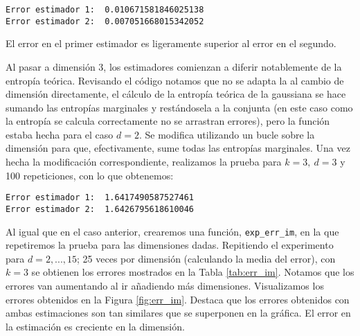 \documentclass[10pt,a4paper]{article} %
\theoremstyle{definition}
\begin{document}
\begin{lstlisting}
Error estimador 1:  0.010671581846025138
Error estimador 2:  0.007051668015342052
\end{lstlisting}

El error en el primer estimador es ligeramente superior al error en el segundo.

Al pasar a dimensión 3, los estimadores comienzan a diferir notablemente de la entropía teórica. Revisando el código notamos que no se adapta la al cambio de dimensión directamente, el cálculo de la entropía teórica de la gaussiana se hace sumando las entropías marginales y restándosela a la conjunta (en este caso como la entropía se calcula correctamente no se arrastran errores), pero la función estaba hecha para el caso $d = 2$. Se modifica utilizando un bucle sobre la dimensión para que, efectivamente, sume todas las entropías marginales. Una vez hecha la modificación correspondiente, realizamos la prueba para $k = 3,\ d = 3$ y 100 repeticiones, con lo que obtenemos:

\begin{lstlisting}
Error estimador 1:  1.6417490587527461
Error estimador 2:  1.6426795618610046
\end{lstlisting}

Al igual que en el caso anterior, crearemos una función, \texttt{exp\_err\_im}, en la que repetiremos la prueba para las dimensiones dadas. Repitiendo el experimento para $d=2,...,15$; 25 veces por dimensión (calculando la media del error), con $k=3$ se obtienen los errores mostrados en la Tabla \ref{tab:err_im}. Notamos que los errores van aumentando al ir añadiendo más dimensiones. Visualizamos los errores obtenidos en la Figura \ref{fig:err_im}. Destaca que los errores obtenidos con ambas estimaciones son tan similares que se superponen en la gráfica. El error en la estimación es creciente en la dimensión.
\end{document}
